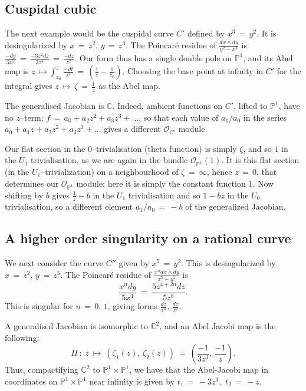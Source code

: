 \documentclass[12pt,reqno]{amsart}
\numberwithin{equation}{section}
\theoremstyle{definition}
\theoremstyle{remark}
\def\bC{{\mathbb {C}}}
\def\bP{{\mathbb {P}}}
\def\pO{{\mathcal O}}
\begin{document}
\subsection{Cuspidal cubic}
 
The next example would be the cuspidal curve $C'$ defined by $x^3 \,=\, y^2$. It is desingularized by
$x \,=\, z^2,\, y \,=\, z^3$. 
The Poincar\'e residue of $\frac{dx\wedge dy}{y^2-x^3}$ is $\frac {-dy}{3 x^2} \,=\, \frac {-3z^2 dz}{3 z^4}\,= 
\, \frac{-dz}{z^2}$. Our form thus has a single double pole on $\bP^1$, and its Abel map is $z\,\longmapsto \int_{z_0}^z\frac{-dt}{t^2} \,=
\,(\frac{1}{z}- \frac{1}{z_0})$. Choosing the base point at infinity in $C'$ for the integral gives 
$z\,\longmapsto\, \zeta \,=\, \frac{1}{z}$ as the Abel map.

The generalised Jacobian is $\bC$. Indeed, ambient functions on $C'$, lifted to $\bP^1$, have no $z$--term: 
$f\,=\, a_0 +a_2z^2 + a_3z^3+\ldots$, so that each value of $a_1/a_0$ in the series $a_0 + a_1z+a_2z^2 + a_3z^3+\ldots$ gives a different $\pO_{C'}$ module.

Our flat section in the $0$--trivialisation (theta function) is simply $\zeta$,  and so $1$ in the $U_1$ 
trivialisation, as we are again in the bundle ${\pO}_{\bP^1}(1)$. It is this flat section (in the 
$U_1$--trivialization) on a neighbourhood of $\zeta \,=\, \infty$, hence $z\,=\,0$, that determines our
${\pO}_{\bP^1}$ module; here it is simply the constant function $1$. Now shifting by
$b$ gives 
$\frac{1}{z}-b$ in the $U_1$ trivialisation and so  $1-bz$ in the $U_0$ trivialisation, so a different 
element $a_1/a_0 \,=\, -b$ of the generalized Jacobian.

\subsection{A higher order  singularity on a rational curve}

We next consider the curve $C''$  given by $x^5 \,=\, y^2$. This is desingularized by $x \,=\, z^2,\, y
\,=\, z^5$. The Poincar\'e residue of $\frac{ x^n dx\wedge dy}{x^5-y^2}$ is $$\frac {x^ndy}{ 5x^4}
\ =\ \frac {5z^{4+2n} dz}{5z^8}.$$
This is singular for $n\,=\,0,\, 1$, giving forms $\frac{dz}{z^4},\, \frac{dz}{z^2}$. 

A generalised Jacobian is isomorphic to $\bC^2$, and an Abel Jacobi map is the following:
$$\Pi\ :\ z\ \longmapsto\ (\zeta_1(z),\, \zeta_2(z))\ =\ (\frac{-1}{3z^3},\, \frac{-1}{z}).$$
Thus, compactifying $\bC^2$ to $\bP^1\times \bP^1$, we have that the Abel-Jacobi map in coordinates
on $\bP^1\times \bP^1$ near infinity is given by $t_1\,=\, -3z^3$,\, $t_2\,=\, -z$.
\end{document}
